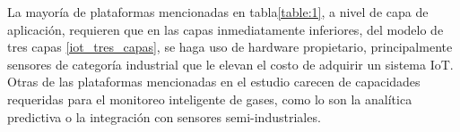\documentclass[stu,12pt,floatsintext]{apa7}
\begin{document}
		La mayoría de plataformas mencionadas en tabla\ref{table:1}, a nivel de capa de aplicación, requieren que en las capas inmediatamente inferiores, del modelo de tres capas \ref{iot_tres_capas}, se haga uso de hardware propietario, principalmente sensores de categoría industrial que le elevan el costo de adquirir un sistema IoT. Otras de las plataformas mencionadas en el estudio carecen de capacidades requeridas para el monitoreo inteligente de gases, como lo son la analítica predictiva o la integración con sensores semi-industriales.
		
		
\end{document}
